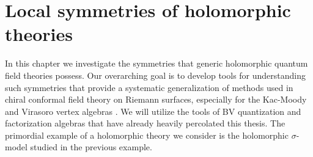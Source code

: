 %
%
%
%
%
%
%
%
%
%
%

\chapter{Local symmetries of holomorphic theories}\label{chap: symmetries}


In this chapter we investigate the symmetries that generic holomorphic quantum field theories possess.
Our overarching goal is to develop tools for understanding such symmetries that provide a systematic generalization of methods used in chiral conformal field theory on Riemann surfaces, especially for the Kac-Moody and Virasoro vertex algebras \cite{IgorKM, KacVertex, BorcherdsVertex}. 
We will utilize the tools of BV quantization and factorization algebras that have already heavily percolated this thesis.
The primordial example of a holomorphic theory we consider is the holomorphic $\sigma$-model studied in the previous example. 


